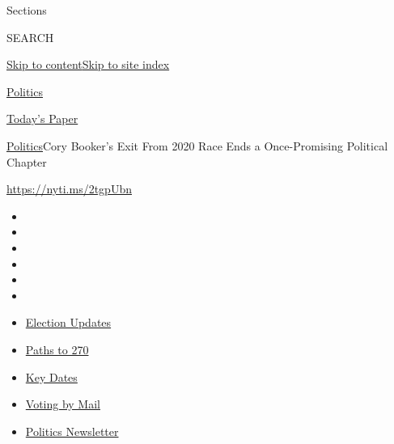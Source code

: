 Sections

SEARCH

\protect\hyperlink{site-content}{Skip to
content}\protect\hyperlink{site-index}{Skip to site index}

\href{https://www.nytimes3xbfgragh.onion/section/politics}{Politics}

\href{https://myaccount.nytimes3xbfgragh.onion/auth/login?response_type=cookie\&client_id=vi}{}

\href{https://www.nytimes3xbfgragh.onion/section/todayspaper}{Today's
Paper}

\href{/section/politics}{Politics}\textbar{}Cory Booker's Exit From 2020
Race Ends a Once-Promising Political Chapter

\url{https://nyti.ms/2tgpUbn}

\begin{itemize}
\item
\item
\item
\item
\item
\item
\end{itemize}

\begin{itemize}
\item
  \href{https://www.nytimes3xbfgragh.onion/live/2020/09/11/us/trump-vs-biden?action=click\&pgtype=Article\&state=default\&region=TOP_BANNER\&context=storylines_menu}{Election
  Updates}
\item
  \href{https://www.nytimes3xbfgragh.onion/interactive/2020/us/elections/election-states-biden-trump.html?action=click\&pgtype=Article\&state=default\&region=TOP_BANNER\&context=storylines_menu}{Paths
  to 270}
\item
  \href{https://www.nytimes3xbfgragh.onion/interactive/2019/us/elections/2020-presidential-election-calendar.html?action=click\&pgtype=Article\&state=default\&region=TOP_BANNER\&context=storylines_menu}{Key
  Dates}
\item
  \href{https://www.nytimes3xbfgragh.onion/interactive/2020/08/31/us/politics/vote-by-mail-deadlines.html?action=click\&pgtype=Article\&state=default\&region=TOP_BANNER\&context=storylines_menu}{Voting
  by Mail}
\item
  \href{https://www.nytimes3xbfgragh.onion/newsletters/politics?action=click\&pgtype=Article\&state=default\&region=TOP_BANNER\&context=storylines_menu}{Politics
  Newsletter}
\end{itemize}

